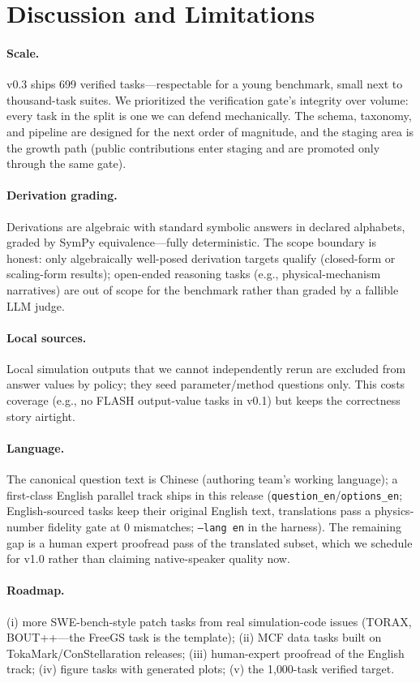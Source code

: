 \section{Discussion and Limitations}
\label{sec:discussion}

\paragraph{Scale.} v0.3 ships 699 verified tasks---respectable for a young benchmark, small next to thousand-task suites. We prioritized the verification gate's integrity over volume: every task in the split is one we can defend mechanically. The schema, taxonomy, and pipeline are designed for the next order of magnitude, and the staging area is the growth path (public contributions enter staging and are promoted only through the same gate).

\paragraph{Derivation grading.} Derivations are algebraic with standard symbolic answers in declared alphabets, graded by SymPy equivalence---fully deterministic. The scope boundary is honest: only algebraically well-posed derivation targets qualify (closed-form or scaling-form results); open-ended reasoning tasks (e.g., physical-mechanism narratives) are out of scope for the benchmark rather than graded by a fallible LLM judge.

\paragraph{Local sources.} Local simulation outputs that we cannot independently rerun are excluded from answer values by policy; they seed parameter/method questions only. This costs coverage (e.g., no FLASH output-value tasks in v0.1) but keeps the correctness story airtight.

\paragraph{Language.} The canonical question text is Chinese (authoring team's working language); a first-class English parallel track ships in this release (\texttt{question\_en}/\texttt{options\_en}; English-sourced tasks keep their original English text, translations pass a physics-number fidelity gate at 0 mismatches; \texttt{--lang en} in the harness). The remaining gap is a human expert proofread pass of the translated subset, which we schedule for v1.0 rather than claiming native-speaker quality now.

\paragraph{Roadmap.} (i) more SWE-bench-style patch tasks from real simulation-code issues (TORAX, BOUT++---the FreeGS task is the template); (ii) MCF data tasks built on TokaMark/ConStellaration releases; (iii) human-expert proofread of the English track; (iv) figure tasks with generated plots; (v) the 1{,}000-task verified target.
